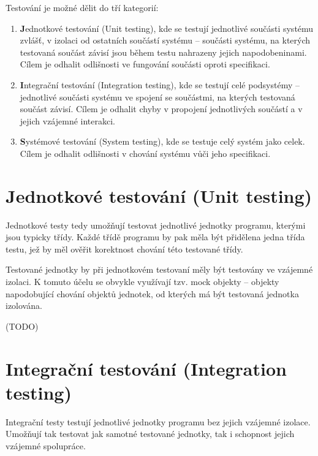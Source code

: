 Testování je možné dělit do tří kategorií:

\begin{enumerate}
  \item {\textbf Jednotkové testování (Unit testing)}, kde se testují jednotlivé součásti systému zvlášť, v izolaci od ostatních součástí systému -- součásti systému, na kterých testovaná součást závisí jsou během testu nahrazeny jejich napodobeninami. Cílem je odhalit odlišnosti ve fungování součásti oproti specifikaci. \cite{ivsTest}
  \item {\textbf Integrační testování (Integration testing)}, kde se testují celé podsystémy -- jednotlivé součásti systému ve spojení se součástmi, na kterých testovaná součást závisí. Cílem je odhalit chyby v propojení jednotlivých součástí a v jejich vzájemné interakci. \cite{ivsTest}
  \item {\textbf Systémové testování (System testing)}, kde se testuje celý systém jako celek. Cílem je odhalit odlišnosti v chování systému vůči jeho specifikaci. \cite{ivsTest}
\end{enumerate}


\section{Jednotkové testování (Unit testing)}

Jednotkové testy tedy umožňují testovat jednotlivé jednotky programu, kterými jsou typicky třídy. Každé třídě programu by pak měla být přidělena jedna třída testu, jež by měl ověřit korektnost chování této testované třídy.

Testované jednotky by při jednotkovém testovaní měly být testovány ve vzájemné izolaci. K tomuto účelu se obvykle využívají tzv. mock objekty -- objekty napodobující chování objektů jednotek, od kterých má být testovaná jednotka izolována.

(TODO)

\section{Integrační testování (Integration testing)}

Integrační testy testují jednotlivé jednotky programu bez jejich vzájemné izolace. Umožňují tak testovat jak samotné testované jednotky, tak i schopnost jejich vzájemné spolupráce.

